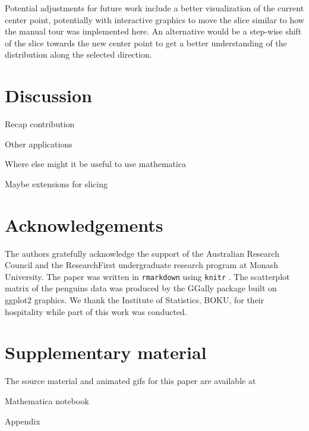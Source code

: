 \documentclass[]{interact}
\theoremstyle{plain}%
\theoremstyle{definition}
\theoremstyle{remark}
\begin{document}
Potential adjustments for future work include a better visualization of
the current center point, potentially with interactive graphics to move
the slice similar to how the manual tour was implemented here. An
alternative would be a step-wise shift of the slice towards the new
center point to get a better understanding of the distribution along the
selected direction.

\hypertarget{sec:discussion}{%
\section{Discussion}\label{sec:discussion}}

Recap contribution

Other applications

Where else might it be useful to use mathematica

Maybe extensions for slicing

\hypertarget{acknowledgements}{%
\section*{Acknowledgements}\label{acknowledgements}}

The authors gratefully acknowledge the support of the Australian
Research Council and the ResearchFirst undergraduate research program at
Monash University. The paper was written in \texttt{rmarkdown}
\citep{rmarkdown} using \texttt{knitr} \citep{knitr}. The scatterplot
matrix of the penguins data was produced by the GGally \citep{GGally}
package built on ggplot2 \citep{ggplot2} graphics. We thank the
Institute of Statistics, BOKU, for their hospitality while part of this
work was conducted.

\hypertarget{supplementary-material}{%
\section*{Supplementary material}\label{supplementary-material}}

The source material and animated gifs for this paper are available at

Mathematica notebook

Appendix



\end{document}
